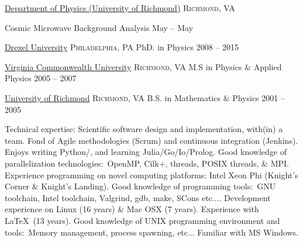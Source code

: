\documentclass[10pt,a4paper]{article}
\begin{document}
\headedsection  %
  {\href{http://physics.richmond.edu/}{Department of Physics (University of Richmond)}}
  {\textsc{Richmond, VA}} {%

  \headedsubsection
    {Cosmic Microwave Background Analysis}
    {May  -- May }
    {}
}


\spacedhrule{0.4em}{-0.4em}



\headedsection
  {\href{http://drexel.edu/}{Drexel University}}
  {\textsc{Philadelphia, PA}} {%
  \headedsubsection
    {PhD. in Physics}
    {2008 -- 2015}
    {}
}

\headedsection
  {\href{http://www.vcu.edu/}{Virginia Commonwealth University}}
  {\textsc{Richmond, VA}} {%
  \headedsubsection
    {M.S in Physics \& Applied Physics}
    {2005 -- 2007}
    {}
}

\headedsection
  {\href{http://www.richmond.edu/}{University of Richmond}}
  {\textsc{Richmond, VA}} {%
  \headedsubsection
    {B.S. in Mathematics \& Physics}
    {2001 -- 2005}
    {}
}


\spacedhrule{0.5em}{-0.2em}


\inlineheadsection  %
  {Technical expertise:}
  {Scientific software design and implementation, with(in) a team.  Fond of Agile methodologies (Scrum) and continuous integration (Jenkins).  Enjoys writing Python/\nsp \CPP, and learning Julia/\nsp Go/\nsp Io/\nsp Prolog.  Good knowledge of parallelization technologies:\ OpenMP, Cilk+,  threads, POSIX threads, \& MPI. Experience programming on novel computing platforms: Intel Xeon Phi (Knight's Corner \& Knight's Landing). Good knowledge of programming tools:\ GNU toolchain, Intel toolchain, Valgrind, gdb, make, SCons etc.... Development experience on Linux (16 years) \& Mac OSX (7 years). Experience with \LaTeX \ (13 years). Good knowledge of UNIX programming environment and tools:\ Memory management, process spawning, etc... Familiar with MS Windows.}
\end{document}

